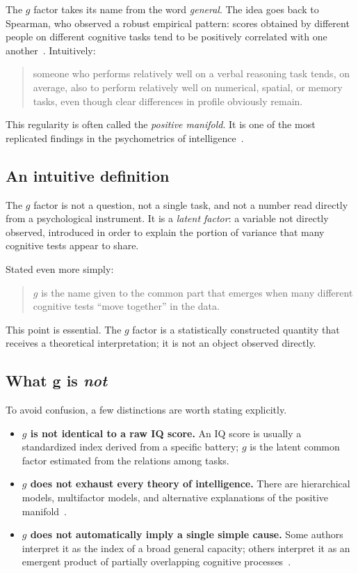 \documentclass[10pt, a4paper]{article}
\theoremstyle{plain}
\theoremstyle{definition}
\theoremstyle{remark}
\begin{document}
The $g$ factor takes its name from the word \emph{general}. The idea goes back
to Spearman, who observed a robust empirical pattern: scores obtained by
different people on different cognitive tasks tend to be positively correlated
with one another~\cite{spearman1904}. Intuitively:

\begin{quote}
someone who performs relatively well on a verbal reasoning task tends, on
average, also to perform relatively well on numerical, spatial, or memory tasks,
even though clear differences in profile obviously remain.
\end{quote}

This regularity is often called the \emph{positive manifold}. It is one of the
most replicated findings in the psychometrics of intelligence~\cite{kovacs2016,
vandermaas2006}.

\subsection{An intuitive definition}

The $g$ factor is not a question, not a single task, and not a number read
directly from a psychological instrument. It is a \emph{latent factor}: a
variable not directly observed, introduced in order to explain the portion of
variance that many cognitive tests appear to share.

Stated even more simply:
\begin{quote}
$g$ is the name given to the common part that emerges when many different
cognitive tests ``move together'' in the data.
\end{quote}

This point is essential. The $g$ factor is a statistically constructed quantity
that receives a theoretical interpretation; it is not an object observed
directly.

\subsection{What g is \emph{not}}

To avoid confusion, a few distinctions are worth stating explicitly.

\begin{itemize}
    \item \textbf{$g$ is not identical to a raw IQ score.} An IQ score is
          usually a standardized index derived from a specific battery; $g$ is
          the latent common factor estimated from the relations among tasks.
    \item \textbf{$g$ does not exhaust every theory of intelligence.} There are
          hierarchical models, multifactor models, and alternative explanations
          of the positive manifold~\cite{cattell1963, carroll1993,
          sternberg1985, sternberg1999, kovacs2016, vandermaas2006}.
    \item \textbf{$g$ does not automatically imply a single simple cause.} Some
          authors interpret it as the index of a broad general capacity; others
          interpret it as an emergent product of partially overlapping cognitive
          processes~\cite{kovacs2016, vandermaas2006}.
\end{itemize}
\end{document}
